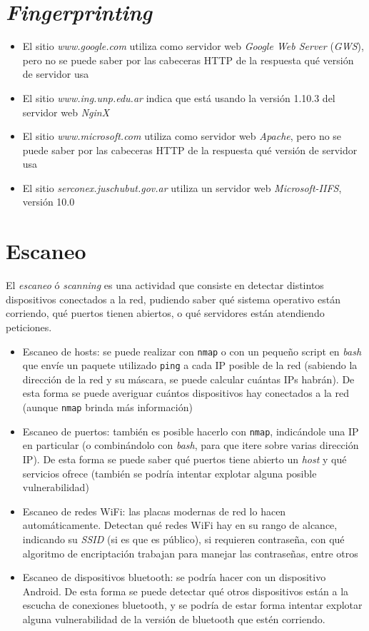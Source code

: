 \section{\emph{Fingerprinting}}

\begin{itemize}
    \item El sitio \emph{www.google.com} utiliza como servidor web \emph{Google Web Server} (\emph{GWS}), pero no se puede saber por las cabeceras HTTP de la respuesta qué versión de servidor usa
    \item El sitio \emph{www.ing.unp.edu.ar} indica que está usando la versión 1.10.3 del servidor web \emph{NginX}  
    \item El sitio \emph{www.microsoft.com} utiliza como servidor web \emph{Apache}, pero no se puede saber por las cabeceras HTTP de la respuesta qué versión de servidor usa
    \item El sitio \emph{serconex.juschubut.gov.ar} utiliza un servidor web \emph{Microsoft-IIFS}, versión 10.0
\end{itemize}

\section{Escaneo}

El \emph{escaneo} ó \emph{scanning} es una actividad que consiste en detectar distintos dispositivos conectados a la red, pudiendo saber qué sistema operativo están corriendo, qué puertos tienen abiertos, o qué servidores están atendiendo peticiones. 

\begin{itemize}
    \item Escaneo de hosts: se puede realizar con \texttt{nmap} o con un pequeño script en \emph{bash} que envíe un paquete utilizado \texttt{ping} a cada IP posible de la red (sabiendo la dirección de la red y su máscara, se puede calcular cuántas IPs habrán). De esta forma se puede averiguar cuántos dispositivos hay conectados a la red (aunque \texttt{nmap} brinda más información)
    \item Escaneo de puertos: también es posible hacerlo con \texttt{nmap}, indicándole una IP en particular (o combinándolo con \emph{bash}, para que itere sobre varias dirección IP). De esta forma se puede saber qué puertos tiene abierto un \emph{host} y qué servicios ofrece (también se podría intentar explotar alguna posible vulnerabilidad)
    \item Escaneo de redes WiFi: las placas modernas de red lo hacen automáticamente. Detectan qué redes WiFi hay en su rango de alcance, indicando su \emph{SSID} (si es que es público), si requieren contraseña, con qué algoritmo de encriptación trabajan para manejar las contraseñas, entre otros
    \item Escaneo de dispositivos bluetooth: se podría hacer con un dispositivo Android. De esta forma se puede detectar qué otros dispositivos están a la escucha de conexiones bluetooth, y se podría de estar forma intentar explotar alguna vulnerabilidad de la versión de bluetooth que estén corriendo.
\end{itemize}


